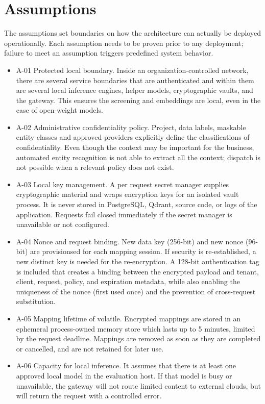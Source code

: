 \documentclass{FastFyp}
\begin{document}
\section{Assumptions}
\label{sec:assumptions}
The assumptions set boundaries on how the architecture can actually be deployed operationally. Each assumption needs to be proven prior to any deployment; failure to meet an assumption triggers predefined system behavior.
\begin{itemize}
\item A-01 Protected local boundary. Inside an organization-controlled network, there are several service boundaries that are authenticated and within them are several local inference engines, helper models, cryptographic vaults, and the gateway. This ensures the screening and embeddings are local, even in the case of open-weight models.
\item A-02 Administrative confidentiality policy. Project, data labels, maskable entity classes and approved providers explicitly define the classifications of confidentiality. Even though the context may be important for the business, automated entity recognition is not able to extract all the context; dispatch is not possible when a relevant policy does not exist.
\item A-03 Local key management. A per request secret manager supplies cryptographic material and wraps encryption keys for an isolated vault process. It is never stored in PostgreSQL, Qdrant, source code, or logs of the application. Requests fail closed immediately if the secret manager is unavailable or not configured.
\item A-04 Nonce and request binding. New data key (256-bit) and new nonce (96-bit) are provisionsed for each mapping session. If security is re-established, a new distinct key is needed for the re-encryption. A 128-bit authentication tag is included that creates a binding between the encrypted payload and tenant, client, request, policy, and expiration metadata, while also enabling the uniqueness of the nonce (first used once) and the prevention of cross-request substitution.
\item A-05 Mapping lifetime of volatile. Encrypted mappings are stored in an ephemeral process-owned memory store which lasts up to 5 minutes, limited by the request deadline. Mappings are removed as soon as they are completed or cancelled, and are not retained for later use.
\item A-06 Capacity for local inference. It assumes that there is at least one approved local model in the evaluation host. If that model is busy or unavailable, the gateway will not route limited content to external clouds, but will return the request with a controlled error.

\end{itemize}
\end{document}
